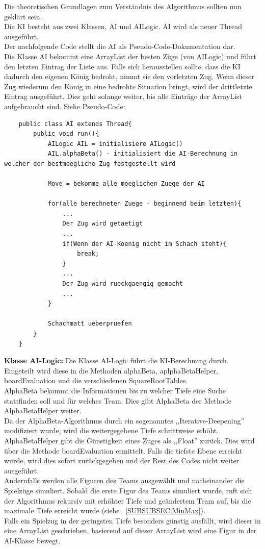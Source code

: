 \documentclass[12pt,a4paper]{article}
\begin{document}
Die theoretischen Grundlagen zum Verständnis des Algorithmus sollten nun geklärt sein.\\
Die KI besteht aus zwei Klassen, AI und AILogic. AI wird als neuer Thread ausgeführt. \\
Der nachfolgende Code stellt die AI als Pseudo-Code-Dokumentation dar.\\
Die Klasse AI bekommt eine ArrayList der besten Züge (von AILogic) und führt den letzten Eintrag der Liste aus. Falls sich herausstellen sollte, dass die KI dadurch den eigenen König bedroht, nimmt sie den vorletzten Zug. Wenn dieser Zug wiederum den König in eine bedrohte Situation bringt, wird der drittletzte Eintrag ausgeführt. Dies geht solange weiter, bis alle Einträge der ArrayList aufgebraucht sind. Siehe Pseudo-Code:

\lstset{language=Java}
\begin{lstlisting}
	public class AI extends Thread{
		public void run(){
			AILogic AIL = initialisiere AILogic()
			AIL.alphaBeta() - initialisiert die AI-Berechnung in welcher der bestmoegliche Zug festgestellt wird
			
			Move = bekomme alle moeglichen Zuege der AI
			
			for(alle berechneten Zuege - beginnend beim letzten){
				...
				Der Zug wird getaetigt
				...
				if(Wenn der AI-Koenig nicht im Schach steht){					
					break;
				}
				...
				Der Zug wird rueckgaengig gemacht
				...
			}
			
			Schachmatt ueberpruefen
		}
	}	
\end{lstlisting}
\newpage
\textbf{Klasse AI-Logic:} Die Klasse AI-Logic führt die KI-Berechnung durch. Eingeteilt wird diese in die Methoden alphaBeta, aplphaBetaHelper, boardEvaluation und die verschiedenen SquareRootTables.\\
AlphaBeta bekommt die Informationen bis zu welcher Tiefe eine Suche stattfinden soll und für welches Team. Dies gibt AlphaBeta der Methode AlphaBetaHelper weiter. \\
 Da der AlphaBeta-Algorithmus durch ein sogenanntes ,,Iterative-Deepening'' modifiziert wurde, wird die weitergegebene Tiefe schrittweise erhöht. \\
 AlphaBetaHelper gibt die Günstigkeit eines Zuges als ,,Float'' zurück. Dies wird über die Methode boardEvaluation ermittelt. Falls die tiefste Ebene erreicht wurde, wird dies sofort zurückgegeben und der Rest des Codes nicht weiter ausgeführt. \\
 Andernfalls werden alle Figuren des Teams ausgewählt und nacheinander die Spielzüge simuliert. Sobald die erste Figur des Teams simuliert wurde, ruft sich der Algorithmus rekursiv mit erhöhter Tiefe und geändertem Team auf, bis die maximale Tiefe erreicht wurde (siehe ~\ref{SUBSUBSEC:MinMax}). \\
 Falls ein Spielzug in der geringsten Tiefe besonders günstig ausfällt, wird dieser in eine ArrayList geschrieben, basierend auf dieser ArrayList wird eine Figur in der AI-Klasse bewegt. \\
 
\end{document}
